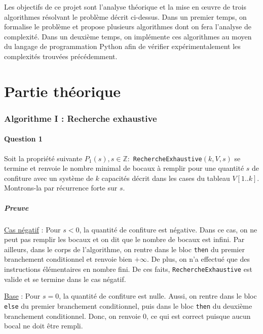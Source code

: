 \documentclass[12pt,a4paper]{article}
\begin{document}
\bigskip
Les objectifs de ce projet sont l'analyse th\'eorique et la mise en \oe uvre de trois algorithmes r\'esolvant le probl\`eme d\'ecrit ci-dessus. Dans un premier temps, on formalise le probl\`eme et propose plusieurs algorithmes dont on fera l'analyse de complexit\'e. Dans un deuxi\`eme temps, on impl\'emente ces algorithmes au moyen du langage de programmation Python afin de v\'erifier exp\'erimentalement les complexit\'es trouv\'ees pr\'ec\'edemment.

\newpage
\part{Partie th\'eorique}

\section{Algorithme I : Recherche exhaustive}

\subsection*{Question 1}
Soit la propri\'et\'e suivante \( P_{1}(s), s \in \mathbb{Z} : \) \texttt{RechercheExhaustive}$(k,V,s)$ se termine et renvoie le nombre minimal de bocaux \`a remplir pour une quantit\'e $s$ de confiture avec un syst\`eme de $k$ capacit\'es d\'ecrit dans les cases du tableau $V[1..k]$.
Montrons-la par r\'ecurrence forte sur $s$.

\subsubsection*{Preuve}
\underline{Cas n\'egatif} : Pour $s < 0$, la quantit\'e de confiture est n\'egative. Dans ce cas, on ne peut pas remplir les bocaux et on dit que le nombre de bocaux est infini. 
Par ailleurs, dans le corps de l'algorithme, on rentre dans le bloc \texttt{then} du premier branchement conditionnel et renvoie bien $+\infty$. De plus, on n'a effectu\'e que des instructions \'el\'ementaires en nombre fini.
De ces faits, \texttt{RechercheExhaustive} est valide et se termine dans le cas n\'egatif.

\medskip
\underline{Base} : Pour \( s = 0\), la quantit\'e de confiture est nulle. Aussi, on rentre dans le bloc \texttt{else} du premier branchement conditionnel, puis dans le bloc \texttt{then} du deuxi\`eme branchement conditionnel. Donc, on renvoie $0$, ce qui est correct puisque aucun bocal ne doit \^etre rempli.
\end{document}
